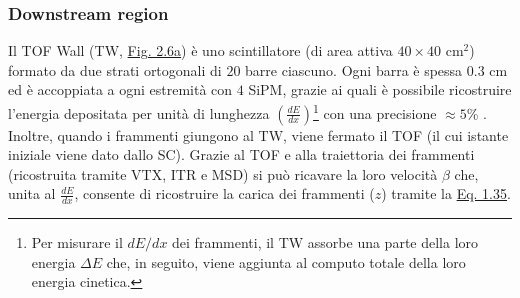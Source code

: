 \documentclass[12pt,a4paper,twoside]{report}
\begin{document}
	\subsubsection{Downstream region}\label{par:downstream_region}
	Il TOF Wall (TW, \hyperref[fig:tw]{Fig. 2.6a}) è uno scintillatore (di area attiva $40\times40\mbox{ cm}^2$) formato da due strati ortogonali di $20$ barre ciascuno. Ogni barra è spessa $0.3\mbox{ cm}$ ed è accoppiata a ogni estremità con $4$ SiPM, grazie ai quali è possibile ricostruire l'energia depositata per unità di lunghezza $\left(\frac{dE}{dx}\right)$\footnote{Per misurare il $dE/dx$ dei frammenti, il TW assorbe una parte della loro energia $\Delta E$ che, in seguito, viene aggiunta al computo totale della loro energia cinetica.} con una precisione $\approx5\%$ \cite{foot_cdr}. Inoltre, quando i frammenti giungono al TW, viene fermato il TOF (il cui istante iniziale viene dato dallo SC). Grazie al TOF e alla traiettoria dei frammenti (ricostruita tramite VTX, ITR e MSD) si può ricavare la loro velocità $\beta$ che, unita al $\frac{dE}{dx}$, consente di ricostruire la carica dei frammenti ($z$) tramite la \hyperref[eq:bethe_bloch]{Eq. 1.35}.
\end{document}
